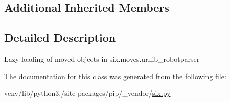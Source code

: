 \subsection*{Additional Inherited Members}


\subsection{Detailed Description}
\begin{DoxyVerb}Lazy loading of moved objects in six.moves.urllib_robotparser\end{DoxyVerb}
 

The documentation for this class was generated from the following file\+:\begin{DoxyCompactItemize}
\item 
venv/lib/python3./site-\/packages/pip/\+\_\+vendor/\hyperlink{pip_2__vendor_2six_8py}{six.\+py}\end{DoxyCompactItemize}
